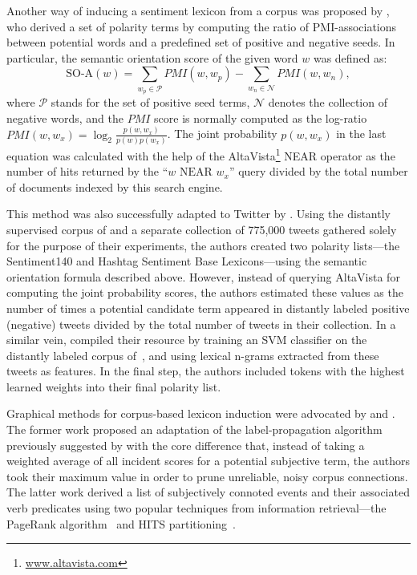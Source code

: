 Another way of inducing a sentiment lexicon from a corpus was proposed
by \citet{Turney:03}, who derived a set of polarity terms by computing
the ratio of PMI-associations between potential words and a predefined
set of positive and negative seeds.  In particular, the semantic
orientation score of the given word $w$ was defined as:
\begin{equation*}
  \textrm{SO-A}(w) = \sum_{w_p\in\mathcal{P}}PMI(w, w_p) - \sum_{w_n\in\mathcal{N}}PMI(w, w_n),
\end{equation*}
where $\mathcal{P}$ stands for the set of positive seed terms,
$\mathcal{N}$ denotes the collection of negative words, and the $PMI$
score is normally computed as the log-ratio
$PMI(w, w_x) = \log_2\frac{p(w, w_x)}{p(w)p(w_x)}$.  The joint
probability $p(w, w_x)$ in the last equation was calculated with the
help of the AltaVista\footnote{\url{www.altavista.com}} NEAR operator
as the number of hits returned by the ``$w\textrm{ NEAR }w_x$'' query
divided by the total number of documents indexed by this search
engine.

This method was also successfully adapted to Twitter by
\citet{Kiritchenko:14}.  Using the distantly supervised corpus of
\citet{Go:09} and a separate collection of 775,000 tweets gathered
solely for the purpose of their experiments, the authors created two
polarity lists---the Sentiment140 and Hashtag Sentiment Base
Lexicons---using the semantic orientation formula described above.
However, instead of querying AltaVista for computing the joint
probability scores, the authors estimated these values as the number
of times a potential candidate term appeared in distantly labeled
positive (negative) tweets divided by the total number of tweets in
their collection.  In a similar vein, \citet{Severyn:15a} compiled
their resource by training an SVM classifier on the distantly labeled
corpus of~\citet{Go:09}, and using lexical n-grams extracted from
these tweets as features.  In the final step, the authors included
tokens with the highest learned weights into their final polarity
list.

Graphical methods for corpus-based lexicon induction were advocated by
\citet{Velikovich:10} and \citet{Feng:11}.  The former work proposed
an adaptation of the label-propagation algorithm previously suggested
by \citet{Rao:09} with the core difference that, instead of taking a
weighted average of all incident scores for a potential subjective
term, the authors took their maximum value in order to prune
unreliable, noisy corpus connections.  The latter work derived a list
of subjectively connoted events and their associated verb predicates
using two popular techniques from information retrieval---the PageRank
algorithm~\cite{Brin:98} and HITS partitioning~\cite{Kleinberg:99}.

